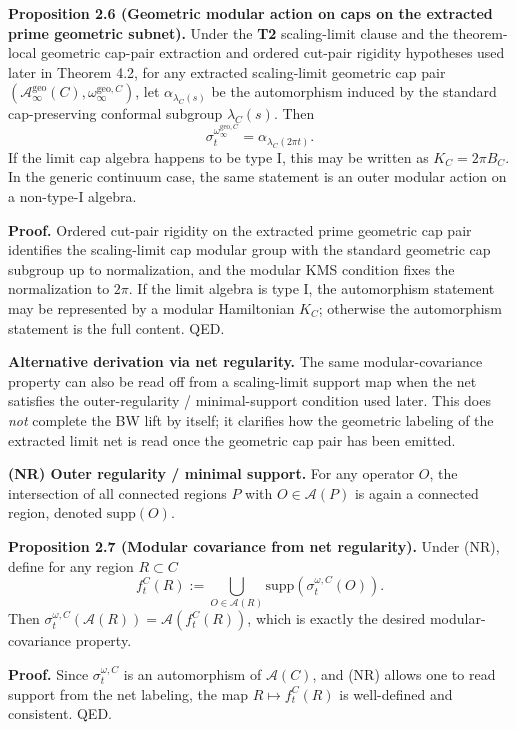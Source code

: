 \textbf{Proposition 2.6 (Geometric modular action on caps on the extracted prime geometric subnet).} Under the \textbf{T2} scaling-limit clause and the theorem-local geometric cap-pair extraction and ordered cut-pair rigidity hypotheses used later in Theorem 4.2, for any extracted scaling-limit geometric cap pair \((\mathcal A_\infty^{\mathrm{geo}}(C),\omega_\infty^{\mathrm{geo},C})\), let \(\alpha_{\lambda_C(s)}\) be the automorphism induced by the standard cap-preserving conformal subgroup \(\lambda_C(s)\). Then
\[
\sigma_t^{\omega_\infty^{\mathrm{geo},C}}
=
\alpha_{\lambda_C(2\pi t)}.
\]
If the limit cap algebra happens to be type I, this may be written as \(K_C=2\pi B_C\). In the generic continuum case, the same statement is an outer modular action on a non-type-I algebra.

\textbf{Proof.} Ordered cut-pair rigidity on the extracted prime geometric cap pair identifies the scaling-limit cap modular group with the standard geometric cap subgroup up to normalization, and the modular KMS condition fixes the normalization to \(2\pi\). If the limit algebra is type I, the automorphism statement may be represented by a modular Hamiltonian \(K_C\); otherwise the automorphism statement is the full content. QED.

\textbf{Alternative derivation via net regularity.} The same modular-covariance property can also be read off from a scaling-limit support map when the net satisfies the outer-regularity / minimal-support condition used later. This does \emph{not} complete the BW lift by itself; it clarifies how the geometric labeling of the extracted limit net is read once the geometric cap pair has been emitted.

\textbf{(NR) Outer regularity / minimal support.} For any operator \(O\), the intersection of all connected regions \(P\) with \(O\in\mathcal A(P)\) is again a connected region, denoted \(\mathrm{supp}(O)\).

\textbf{Proposition 2.7 (Modular covariance from net regularity).} Under (NR), define for any region \(R\subset C\)
\[
f_t^C(R)
:=
\bigcup_{O\in \mathcal A(R)}
\mathrm{supp}\!\left(\sigma_t^{\omega,C}(O)\right).
\]
Then \(\sigma_t^{\omega,C}(\mathcal A(R))=\mathcal A(f_t^C(R))\), which is exactly the desired modular-covariance property.

\textbf{Proof.} Since \(\sigma_t^{\omega,C}\) is an automorphism of \(\mathcal A(C)\), and (NR) allows one to read support from the net labeling, the map \(R\mapsto f_t^C(R)\) is well-defined and consistent. QED.

